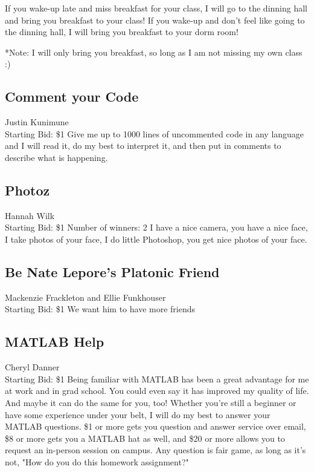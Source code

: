 \documentclass[11pt]{article}
\begin{document}
If you wake-up late and miss breakfast for your class, I will go to the dinning hall and bring you breakfast to your class!
If you wake-up and don't feel like going to the dinning hall, I will bring you breakfast to your dorm room!

*Note: I will only bring you breakfast, so long as I am not missing my own class :)
\subsection{Comment your Code}
Justin Kunimune
\\
Starting Bid: \$1
\newline
Give me up to 1000 lines of uncommented code in any language and I will read it, do my best to interpret it, and then put in comments to describe what is happening.
\subsection{Photoz }
Hannah Wilk
\\
Starting Bid: \$1
\newline
Number of winners: 2
\newline
I have a nice camera, you have a nice face, I take photos of your face, I do little Photoshop, you get nice photos of your face.
\subsection{Be Nate Lepore's Platonic Friend}
Mackenzie Frackleton and Ellie Funkhouser 
\\
Starting Bid: \$1
\newline
We want him to have more friends
\subsection{MATLAB Help}
Cheryl Danner
\\
Starting Bid: \$1
\newline
Being familiar with MATLAB has been a great advantage for me at work and in grad school. You could even say it has improved my quality of life. And maybe it can do the same for you, too! Whether you're still a beginner or have some experience under your belt, I will do my best to answer your MATLAB questions. \$1 or more gets you question and answer service over email, \$8 or more gets you a MATLAB hat as well, and \$20 or more allows you to request an in-person session on campus. Any question is fair game, as long as it's not, "How do you do this homework assignment?"
\end{document}
